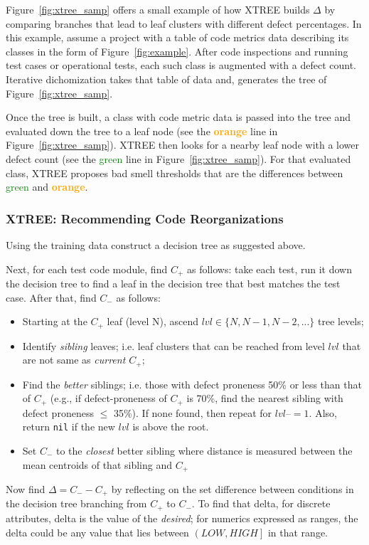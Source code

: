 \documentclass[twocolumn,5p]{elsarticle}
\newcommand{\fig}[1]{Figure~\ref{fig:#1}}
\theoremstyle{break}
\begin{document}
	\fig{xtree_samp} offers
	a small example of how XTREE builds
	$\Delta$ by comparing branches that lead to leaf clusters
	with different defect percentages. In this example, assume a project with 
	a 
	table of code metrics data describing its classes in the form of 
	\fig{example}. 
	After code inspections and running test cases or operational
	tests, each such class is augmented with a defect count.
	Iterative dichomization takes that table of data and,
	generates the tree of \fig{xtree_samp}.
	
	Once the tree is built, a class with code metric data is passed into the 
	tree and evaluated down the tree to a leaf node (see the 
	\textcolor{orange}{{\bf orange}} line in \fig{xtree_samp}).
	XTREE then looks for a nearby leaf node with a lower defect
	count (see the \textcolor{green}{{green}} line in \fig{xtree_samp}). For 
	that evaluated class, XTREE proposes bad smell
	thresholds that are the differences between
	\textcolor{green}{{green}} and \textcolor{orange}{{\bf orange}}.
	
	
	\subsubsection{XTREE: Recommending Code Reorganizations}
		\label{sect:xtreextree2}
	Using the training data construct a decision tree as suggested above.
	
	Next, for each test code module,
	find $C_+$ as follows: take each test, run it down the decision tree to 
	find a leaf in the decision tree that best matches the test case.
	After that,	find $C_-$ as follows:
	\begin{itemize}
		\item Starting at the  $C_+$ leaf (level N), ascend $lvl\in 
		\{N,N-1,N-2, 
		...\}$ tree 
		levels;
		\item Identify {\em sibling} leaves; i.e. leaf clusters that can be 
		reached from level $lvl$ that are not same as {\em current $C_+$};
		\item Find the {\em better} siblings; i.e. those with defect proneness 
		50\% or less than that of $C_+$ (e.g., if defect-proneness of $C_+$ is 
		70\%, find the nearest sibling with defect proneness $\leq$ 35\%). If 
		none found, then repeat for $lvl$--$=1$. Also, return \texttt{nil} if 
		the new $lvl$ is above the root.
		\item  Set $C_-$ to the  {\em closest} better sibling where distance is 
		measured between the mean centroids of that sibling and {\em $C_+$}
	\end{itemize}
	Now find $\Delta = C_- - C_+$  by reflecting
	on the set difference between  conditions in the decision tree branching 
	from $C_+$ to $C_-$. To find that delta,
	for discrete attributes, delta is the value of the {\em desired}; for 
	numerics  expressed as ranges, the delta could be any value that lies 
	between $\left( LOW, HIGH\right]$ in that range.
	
\end{document}
